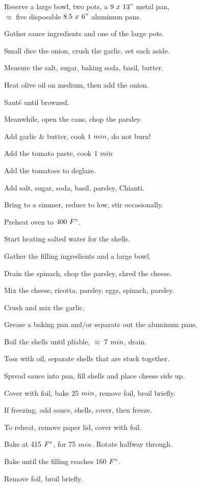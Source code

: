 \begin{preparation}
\item Reserve a large bowl, two pots, a $9~x~13"$ metal pan,\\
	$\approx$ five disposable $8.5~x~6"$ aluminum pans.
\item Gather sauce ingredients and one of the large pots.
\item Small dice the onion, crush the garlic, set each aside.
\item Measure the salt, sugar, baking soda, basil, butter.
\item Heat olive oil on medium, then add the onion.
\item Saut\'{e} until browned.
\item Meanwhile, open the cans, chop the parsley.
\item Add garlic \& butter, cook $1~\minute$, do not burn!
\item Add the tomato paste, cook $1~\minute$
\item Add the tomatoes to deglaze.
\item Add salt, sugar, soda, basil, parsley, Chianti.
\item Bring to a simmer, reduce to low, stir occasionally.
\item Preheat oven to $400~\Fahrenheit$.
\item Start heating salted water for the shells.
\item Gather the filling ingredients and a large bowl.
\item Drain the spinach, chop the parsley, shred the cheese.
\item Mix the cheese, ricotta, parsley, eggs, spinach, parsley.
\item Crush and mix the garlic.
\item Grease a baking pan and/or separate out the aluminum pans.
\item Boil the shells until pliable, $\approx$ 7 $\minute$, drain.
\item Toss with oil, separate shells that are stuck together.
\item Spread sauce into pan, fill shells and place cheese side up.
\item Cover with foil, bake 25 $\minute$, remove foil, broil briefly.
\item If freezing, add sauce, shells, cover, then freeze.
\item To reheat, remove paper lid, cover with foil.
\item Bake at 415 $\Fahrenheit$, for 75 $\minute$.
	Rotate halfway through.
\item Bake until the filling reaches 160 $\Fahrenheit$.
\item Remove foil, broil briefly.
\end{preparation}


\recipeend%
